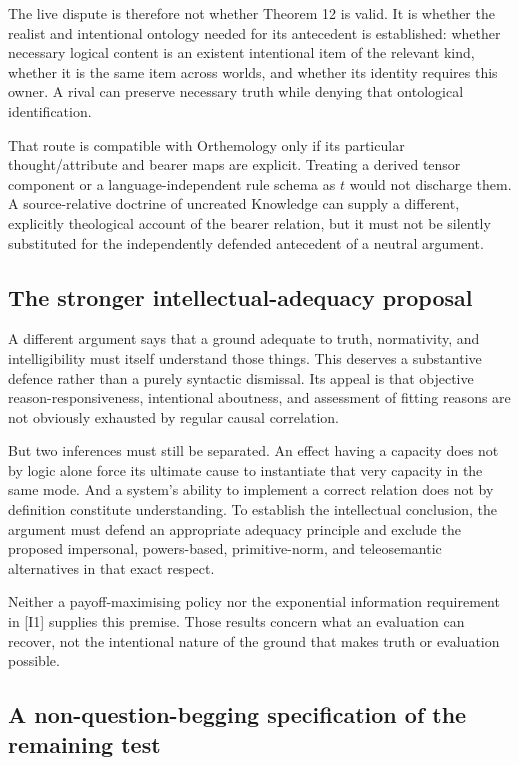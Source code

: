 \documentclass[11pt,a4paper]{article}
\begin{document}
The live dispute is therefore not whether Theorem 12 is valid. It is
whether the realist and intentional ontology needed for its antecedent
is established: whether necessary logical content is an existent
intentional item of the relevant kind, whether it is the same item
across worlds, and whether its identity requires this owner. A rival can
preserve necessary truth while denying that ontological identification.

That route is compatible with Orthemology only if its particular
thought/attribute and bearer maps are explicit. Treating a derived
tensor component or a language-independent rule schema as \(t\) would
not discharge them. A source-relative doctrine of uncreated Knowledge
can supply a different, explicitly theological account of the bearer
relation, but it must not be silently substituted for the independently
defended antecedent of a neutral argument.

\subsection{The stronger intellectual-adequacy
proposal}\label{the-stronger-intellectual-adequacy-proposal}

A different argument says that a ground adequate to truth, normativity,
and intelligibility must itself understand those things. This deserves a
substantive defence rather than a purely syntactic dismissal. Its appeal
is that objective reason-responsiveness, intentional aboutness, and
assessment of fitting reasons are not obviously exhausted by regular
causal correlation.

But two inferences must still be separated. An effect having a capacity
does not by logic alone force its ultimate cause to instantiate that
very capacity in the same mode. And a system's ability to implement a
correct relation does not by definition constitute understanding. To
establish the intellectual conclusion, the argument must defend an
appropriate adequacy principle and exclude the proposed impersonal,
powers-based, primitive-norm, and teleosemantic alternatives in that
exact respect.

Neither a payoff-maximising policy nor the exponential information
requirement in {[}I1{]} supplies this premise. Those results concern
what an evaluation can recover, not the intentional nature of the ground
that makes truth or evaluation possible.

\subsection{A non-question-begging specification of the remaining
test}\label{a-non-question-begging-specification-of-the-remaining-test}
\end{document}
